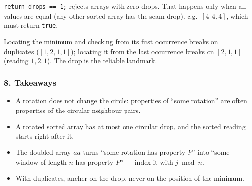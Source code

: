 \begin{warningbox}
\texttt{return drops == 1;} rejects arrays with zero drops. That happens only when all values are equal (any other sorted array has the seam drop), e.g.\ $[4,4,4]$, which must return \texttt{true}.
\end{warningbox}

\begin{warningbox}
Locating the minimum and checking from its first occurrence breaks on duplicates ($[1,2,1,1]$); locating it from the last occurrence breaks on $[2,1,1]$ (reading $1,2,1$). The drop is the reliable landmark.
\end{warningbox}

\subsubsection*{8. Takeaways}

\begin{itemize}[leftmargin=*]
    \item A rotation does not change the circle: properties of ``some rotation'' are often properties of the circular neighbour pairs.
    \item A rotated sorted array has at most one circular drop, and the sorted reading starts right after it.
    \item The doubled array $aa$ turns ``some rotation has property $P$'' into ``some window of length $n$ has property $P$'' --- index it with $j \bmod n$.
    \item With duplicates, anchor on the drop, never on the position of the minimum.
\end{itemize}

